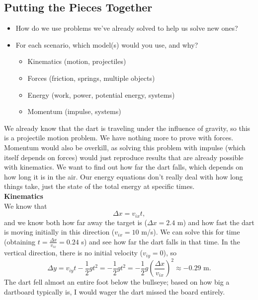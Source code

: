 \documentclass[]{article}
\begin{document}
\begin{PresentSpace}
\vspace{-10pt}
\section*{Putting the Pieces Together}
\vspace{-10pt}
\begin{itemize}
	\item How do we use problems we've already solved to help us solve new ones?
	\item For each scenario, which model(s) would you use, and why?
	\begin{itemize}
		\item Kinematics (motion, projectiles)
		\item Forces (friction, springs, multiple objects)
		\item Energy (work, power, potential energy, systems)
		\item Momentum (impulse, systems)
	\end{itemize}
\end{itemize}
\end{PresentSpace}
\newpage
\begin{TeacherMargin}
\noindent We already know that the dart is traveling under the influence of gravity, so this is a projectile motion problem. We have nothing more to prove with forces. Momentum would also be overkill, as solving this problem with impulse (which itself depends on forces) would just reproduce results that are already possible with kinematics. We want to find out how far the dart falls, which depends on how long it is in the air. Our energy equations don't really deal with how long things take, just the state of the total energy at specific times. \\

\noindent\textbf{Kinematics} \\
We know that
\[
\Delta x = v_{ix} t,
\]
and we know both how far away the target is ($\Delta x = 2.4$ m) and how fast the dart is moving initially in this direction ($v_{ix} = 10$ m/s). We can solve this for time (obtaining $t=\frac{\Delta x}{v_{ix}}=0.24$ s) and see how far the dart falls in that time. In the vertical direction, there is no initial velocity ($v_{iy}=0$), so
\[
\Delta y = v_{iy}t-\frac{1}{2}gt^{2} = -\frac{1}{2}gt^{2} = -\frac{1}{2}g\left(\frac{\Delta x}{v_{ix}}\right)^{2} \approx -0.29\text{ m}.
\]
The dart fell almost an entire foot below the bullseye; based on how big a dartboard typically is, I would wager the dart missed the board entirely.
\end{TeacherMargin}
\end{document}

